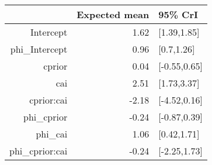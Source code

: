 \begin{tabular}{rrl}
  \hline
 & Expected mean & 95\% CrI \\ 
  \hline
Intercept & 1.62 & [1.39,1.85] \\ 
  phi\_Intercept & 0.96 & [0.7,1.26] \\ 
  cprior & 0.04 & [-0.55,0.65] \\ 
  cai & 2.51 & [1.73,3.37] \\ 
  cprior:cai & -2.18 & [-4.52,0.16] \\ 
  phi\_cprior & -0.24 & [-0.87,0.39] \\ 
  phi\_cai & 1.06 & [0.42,1.71] \\ 
  phi\_cprior:cai & -0.24 & [-2.25,1.73] \\ 
   \hline
\end{tabular}

